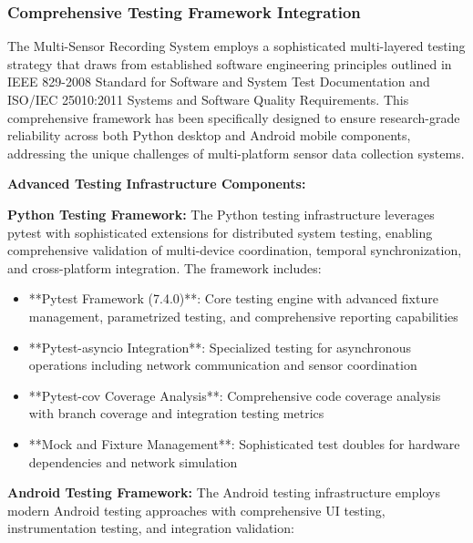 \documentclass[12pt,a4paper]{report}
\begin{document}
\subsubsection{Comprehensive Testing Framework Integration}

The Multi-Sensor Recording System employs a sophisticated multi-layered testing strategy that draws from established
software engineering principles outlined in IEEE 829-2008 Standard for Software and System Test Documentation and
ISO/IEC 25010:2011 Systems and Software Quality Requirements. This comprehensive framework has been specifically
designed to ensure research-grade reliability across both Python desktop and Android mobile components, addressing the
unique challenges of multi-platform sensor data collection systems.

\textbf{Advanced Testing Infrastructure Components:}

\textbf{Python Testing Framework:}
The Python testing infrastructure leverages pytest with sophisticated extensions for distributed system testing,
enabling comprehensive validation of multi-device coordination, temporal synchronization, and cross-platform
integration. The framework includes:

\begin{itemize}
\item **Pytest Framework (7.4.0)**: Core testing engine with advanced fixture management, parametrized testing, and
  comprehensive reporting capabilities
\item **Pytest-asyncio Integration**: Specialized testing for asynchronous operations including network communication and
  sensor coordination
\item **Pytest-cov Coverage Analysis**: Comprehensive code coverage analysis with branch coverage and integration testing
  metrics
\item **Mock and Fixture Management**: Sophisticated test doubles for hardware dependencies and network simulation

\end{itemize}
\textbf{Android Testing Framework:}
The Android testing infrastructure employs modern Android testing approaches with comprehensive UI testing,
instrumentation testing, and integration validation:
\end{document}

